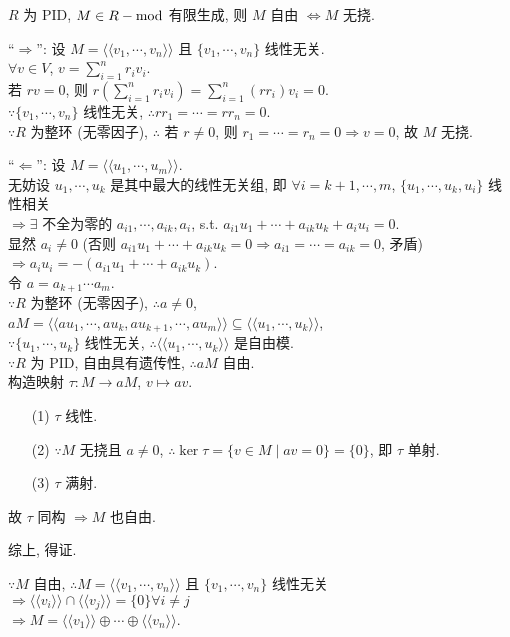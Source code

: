 \documentclass{note}
\begin{document}
\begin{thm}[(课本定理 6.6)]
    $R$ 为 PID, $M\in R-\operatorname{mod}$ 有限生成, 则 $M$ 自由 $\Longleftrightarrow M$ 无挠.
\end{thm}
\begin{pf}
    ``$\Longrightarrow$'': 设 $M=\langle\langle v_1,\cdots,v_n\rangle\rangle$ 且 $\{v_1,\cdots,v_n\}$ 线性无关.\\
    $\forall v\in V$, $v=\sum_{i=1}^nr_iv_i$.\\
    若 $rv=0$, 则 $r\left(\sum_{i=1}^nr_iv_i\right)=\sum_{i=1}^n(rr_i)v_i=0$.\\
    $\because\{v_1,\cdots,v_n\}$ 线性无关, $\therefore rr_1=\cdots=rr_n=0$.\\
    $\because R$ 为整环 (无零因子), $\therefore$ 若 $r\neq 0$, 则 $r_1=\cdots=r_n=0\Longrightarrow v=0$, 故 $M$ 无挠.

    ``$\Longleftarrow$'': 设 $M=\langle\langle u_1,\cdots,u_m\rangle\rangle$.\\
    无妨设 $u_1,\cdots,u_k$ 是其中最大的线性无关组, 即 $\forall i=k+1,\cdots,m$, $\{u_1,\cdots,u_k,u_i\}$ 线性相关\\
    $\Longrightarrow\exists$ 不全为零的 $a_{i1},\cdots,a_{ik},a_i$, s.t. $a_{i1}u_1+\cdots+a_{ik}u_k+a_iu_i=0$.\\
    显然 $a_i\neq 0$ (否则 $a_{i1}u_1+\cdots+a_{ik}u_k=0\Longrightarrow a_{i1}=\cdots=a_{ik}=0$, 矛盾) $\Longrightarrow a_iu_i=-(a_{i1}u_1+\cdots+a_{ik}u_k)$.\\
    令 $a=a_{k+1}\cdots a_m$.\\
    $\because R$ 为整环 (无零因子), $\therefore a\neq 0$,\\
    $aM=\langle\langle au_1,\cdots,au_k,au_{k+1},\cdots,au_m\rangle\rangle\subseteq\langle\langle u_1,\cdots,u_k\rangle\rangle$,\\
    $\because\{u_1,\cdots,u_k\}$ 线性无关, $\therefore\langle\langle u_1,\cdots,u_k\rangle\rangle$ 是自由模.\\
    $\because R$ 为 PID, 自由具有遗传性, $\therefore aM$ 自由.\\
    构造映射 $\tau:M\rightarrow aM$, $v\mapsto av$.
    \begin{itemize}
        \item[(1)] $\tau$ 线性.
        \item[(2)] $\because M$ 无挠且 $a\neq 0$, $\therefore\ker\tau=\{v\in M\mid av=0\}=\{0\}$, 即 $\tau$ 单射.
        \item[(3)] $\tau$ 满射.
    \end{itemize}
    故 $\tau$ 同构 $\Longrightarrow M$ 也自由.

    综上, 得证.
\end{pf}
$\because M$ 自由, $\therefore M=\langle\langle v_1,\cdots,v_n\rangle\rangle$ 且 $\{v_1,\cdots,v_n\}$ 线性无关 $\Longrightarrow\langle\langle v_i\rangle\rangle\cap\langle\langle v_j\rangle\rangle=\{0\}\forall i\neq j$\\
$\Longrightarrow M=\langle\langle v_1\rangle\rangle\oplus\cdots\oplus\langle\langle v_n\rangle\rangle$.
\end{document}
